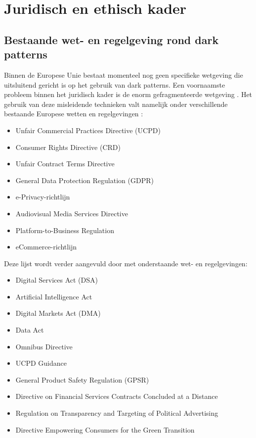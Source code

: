 \pagebreak

\section{Juridisch en ethisch kader}
\label{sec:juridisch-ethisch}

\subsection{Bestaande wet- en regelgeving rond dark patterns}
\label{subsec:regelgeving}

\vspace{1em}
Binnen de Europese Unie bestaat momenteel nog geen specifieke wetgeving die uitsluitend gericht is op het gebruik van dark patterns. Een voornaamste probleem binnen het juridisch kader is de enorm gefragmenteerde wetgeving \autocite{EPRS2025}. Het gebruik van deze misleidende technieken valt namelijk onder verschillende bestaande Europese wetten en regelgevingen \autocite{Commissie2022}:

\begin{itemize}
    \item Unfair Commercial Practices Directive (UCPD)
    \item Consumer Rights Directive (CRD)
    \item Unfair Contract Terms Directive
    \item General Data Protection Regulation (GDPR)
    \item e-Privacy-richtlijn
    \item Audiovisual Media Services Directive
    \item Platform-to-Business Regulation
    \item eCommerce-richtlijn
\end{itemize}

\vspace{1em}

Deze lijst wordt verder aangevuld door \textcite{ETA2025} met onderstaande wet- en regelgevingen:

\begin{itemize}
    \item Digital Services Act (DSA)
    \item Artificial Intelligence Act
    \item Digital Markets Act (DMA)
    \item Data Act
    \item Omnibus Directive
    \item UCPD Guidance
    \item General Product Safety Regulation (GPSR)
    \item Directive on Financial Services Contracts Concluded at a Distance
    \item Regulation on Transparency and Targeting of Political Advertising
    \item Directive Empowering Consumers for the Green Transition
\end{itemize}

